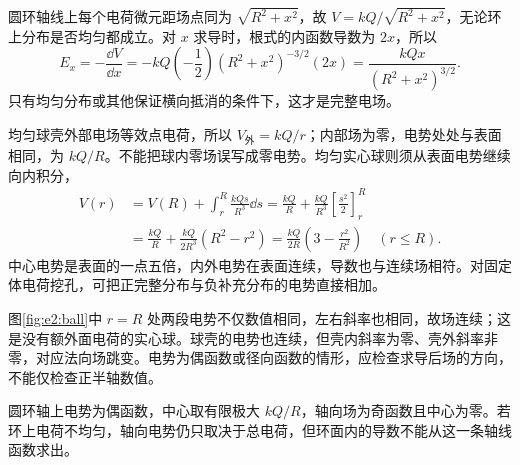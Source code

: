 圆环轴线上每个电荷微元距场点同为 $\sqrt{R^2+x^2}$，故 $V=kQ/\sqrt{R^2+x^2}$，无论环上分布是否均匀都成立。对 $x$ 求导时，根式的内函数导数为 $2x$，所以
\[
 E_x=-\frac{\dd V}{\dd x}
 =-kQ\left(-\frac12\right)(R^2+x^2)^{-3/2}(2x)
 =\frac{kQx}{(R^2+x^2)^{3/2}}.
\]只有均匀分布或其他保证横向抵消的条件下，这才是完整电场。

均匀球壳外部电场等效点电荷，所以 $V_{\text{外}}=kQ/r$；内部场为零，电势处处与表面相同，为 $kQ/R$。不能把球内零场误写成零电势。均匀实心球则须从表面电势继续向内积分，
\[
 \begin{aligned}
 V(r)&=V(R)+\int_r^R\frac{kQs}{R^3}\dd s
 =\frac{kQ}{R}+\frac{kQ}{R^3}\left[\frac{s^2}{2}\right]_r^R\\
 &=\frac{kQ}{R}+\frac{kQ}{2R^3}(R^2-r^2)
 =\frac{kQ}{2R}\left(3-\frac{r^2}{R^2}\right)\quad(r\le R).
\end{aligned}
\]
中心电势是表面的一点五倍，内外电势在表面连续，导数也与连续场相符。对固定体电荷挖孔，可把正完整分布与负补充分布的电势直接相加。

图\ref{fig:e2:ball}中 $r=R$ 处两段电势不仅数值相同，左右斜率也相同，故场连续；这是没有额外面电荷的实心球。球壳的电势也连续，但壳内斜率为零、壳外斜率非零，对应法向场跳变。电势为偶函数或径向函数的情形，应检查求导后场的方向，不能仅检查正半轴数值。

圆环轴上电势为偶函数，中心取有限极大 $kQ/R$，轴向场为奇函数且中心为零。若环上电荷不均匀，轴向电势仍只取决于总电荷，但环面内的导数不能从这一条轴线函数求出。

